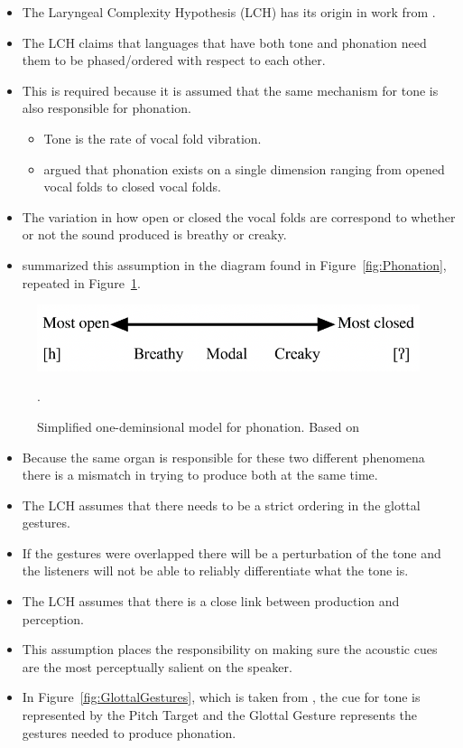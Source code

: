 \documentclass[12pt, letterpaper]{article}
\begin{document}
\begin{itemize}
	\item The Laryngeal Complexity Hypothesis (LCH) has its origin in work from \citet{silvermanLaryngealComplexityOtomanguean1997,blankenshipTimeCourseBreathiness1997,blankenshipTimingNonmodalPhonation2002}.
	\item The LCH claims that languages that have both tone and phonation need them to be phased/ordered with respect to each other. 
	\item This is required because it is assumed that the same mechanism for tone is also responsible for phonation. 
	\begin{itemize}
		\item Tone is the rate of vocal fold vibration. 
		\item \citet{ladefogedPreliminariesLinguisticPhonetics1971,gordonPhonationTypesCrosslinguistic2001} argued that phonation exists on a single dimension ranging from opened vocal folds to closed vocal folds. 
	\end{itemize} 
	\item The variation in how open or closed the vocal folds are correspond to whether or not the sound produced is breathy or creaky. 
	\item \citet{ladefogedPreliminariesLinguisticPhonetics1971,gordonPhonationTypesCrosslinguistic2001} summarized this assumption in the diagram found in Figure~\ref{fig:Phonation}, repeated in Figure~\ref{fig:Phonation2}.
\end{itemize}
\begin{figure}[!h]
	\centering
	\includegraphics[width=.6\textwidth]{../Phonation.png}
	\caption{Simplified one-deminsional model for phonation. Based on \citet{ladefogedPreliminariesLinguisticPhonetics1971,gordonPhonationTypesCrosslinguistic2001}}.
	\label{fig:Phonation2}
\end{figure}
\vspace{-2ex}
\begin{itemize}
	\item Because the same organ is responsible for these two different phenomena there is a mismatch in trying to produce both at the same time. 
	\item The LCH assumes that there needs to be a strict ordering in the glottal gestures. 
	\item If the gestures were overlapped there will be a perturbation of the tone and the listeners will not be able to reliably differentiate what the tone is.
	\item The LCH assumes that there is a close link between production and perception. 
	\item This assumption places the responsibility on making sure the acoustic cues are the most perceptually salient on the speaker. 
	\item In Figure~\ref{fig:GlottalGestures}, which is taken from \citet{dicanioCoarticulationToneGlottal2012}, the cue for tone is represented by the Pitch Target and the Glottal Gesture represents the gestures needed to produce phonation. 
\end{itemize}
\end{document}
